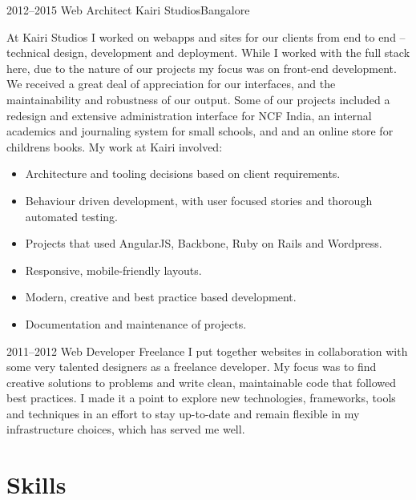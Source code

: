 \documentclass[11pt,a4paper,sans]{moderncv}        %
\begin{document}
\vspace{8pt}

\cventry
{\textcolor{light}{2012--2015}}
{Web Architect}
{}
{Kairi Studios}{Bangalore}
{At Kairi Studios I worked on webapps and sites for our clients from end to end -- technical design, development and deployment. While I worked with the full stack here, due to the nature of our projects my focus was on front-end development. We received a great deal of appreciation for our interfaces, and the maintainability and robustness of our output.
\endgraf
\vspace{6pt}
Some of our projects included a redesign and extensive administration interface for NCF India, an internal academics and journaling system for small schools, and and an online store for childrens books. My work at Kairi involved:
\vspace{6pt}
\begin{itemize}
  \item Architecture and tooling decisions based on client requirements.
  \item Behaviour driven development, with user focused stories and thorough automated testing.
  \item Projects that used AngularJS, Backbone, Ruby on Rails and Wordpress.
  \item Responsive, mobile-friendly layouts.
  \item Modern, creative and best practice based development.
  \item Documentation and maintenance of projects.
\end{itemize}}

\vspace{8pt}

\cventry
{\textcolor{light}{2011--2012}}
{Web Developer}
{}
{Freelance}{}
{I put together websites in collaboration with some very talented designers as a freelance developer. My focus was to find creative solutions to problems and write clean, maintainable code that followed best practices. I made it a point to explore new technologies, frameworks, tools and techniques in an effort to stay up-to-date and remain flexible in my infrastructure choices, which has served me well.}

\vspace{6pt}

\section{Skills}
\end{document}
